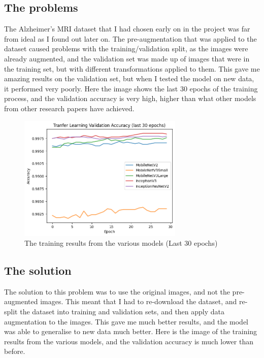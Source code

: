 \documentclass[]{final_report}
\begin{document}
\subsection{The problems}
The Alzheimer's MRI dataset that I had chosen early on in the project was far from ideal as I found out later on.
The pre-augmentation that was applied to the dataset caused problems with the training/validation split, as the 
images were already augmented, and the validation set was made up of images that were in the training set, but 
with different transformations applied to them. This gave me amazing results on the validation set, but when I 
tested the model on new data, it performed very poorly. Here the image shows the last 30 epochs of the training process,
and the validation accuracy is very high, higher than what other models from other research papers have achieved.

\begin{figure}[h]
  \centering
  \includegraphics[width=0.7\textwidth]{images/bad-training-result.png}
  \caption{The training results from the various models (Last 30 epochs)}
  \label{fig:training_results}
\end{figure}

\pagebreak

\subsection{The solution}
The solution to this problem was to use the original images, and not the pre-augmented images.
This meant that I had to re-download the dataset, and re-split the dataset into training and validation sets,
and then apply data augmentation to the images. This gave me much better results, and the model was able to generalise
to new data much better. Here is the image of the training results from the various models, and the validation accuracy is much lower than before.
\end{document}
